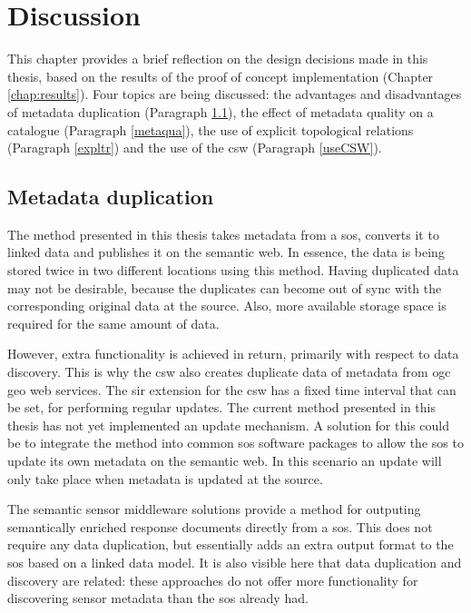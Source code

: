 
\chapter{Discussion}
\label{chap:disc}

This chapter provides a brief reflection on the design decisions made in this thesis, based on the  results of the proof of concept implementation (Chapter \ref{chap:results}). Four topics are being discussed: the advantages and disadvantages of metadata duplication (Paragraph \ref{metadup}), the effect of metadata quality on a catalogue (Paragraph \ref{metaqua}), the use of explicit topological relations (Paragraph \ref{expltr}) and the use of the \acf{csw} (Paragraph \ref{useCSW}).

\section{Metadata duplication}
\label{metadup}
The method presented in this thesis takes metadata from a \ac{sos}, converts it to linked data and publishes it on the semantic web. In essence, the data is being stored twice in two different locations using this method. Having duplicated data  may not be desirable, because the duplicates can become out of sync with the corresponding original data at the source. Also, more available storage space is required for the same amount of data. 

However, extra functionality is achieved in return, primarily with respect to data discovery. This is why the \ac{csw} also creates duplicate data of metadata from \ac{ogc} geo web services. The \ac{sir} extension for the \ac{csw} has a fixed time interval that can be set, for performing regular updates. The current method presented in this thesis has not yet implemented an update mechanism. A solution for this could be to integrate the method into common \ac{sos} software packages to allow the \ac{sos} to update its own metadata on the semantic web. In this scenario an update will only take place when metadata is updated at the source.

The semantic sensor middleware solutions provide a method for outputing semantically enriched response documents directly from a \ac{sos}. This does not require any data duplication, but essentially adds an extra output format to the \ac{sos} based on a linked data model. It is also visible here that data duplication and discovery are related: these approaches do not offer more functionality for discovering sensor metadata than the \ac{sos} already had.       

